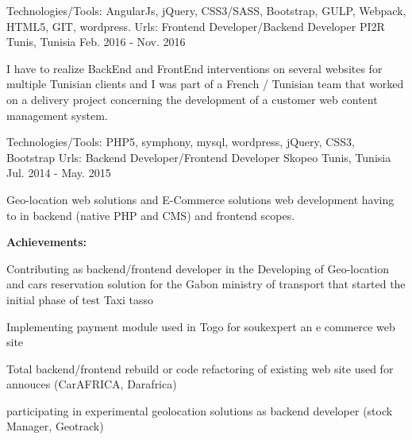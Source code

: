 \begin{cventries}
{\begin{cvitems}
      \end{cvitems}
    }
    {\textcolor{awesome}{Technologies/Tools: } {\color{graytext}}  {AngularJs, jQuery, CSS3/SASS, Bootstrap, GULP, Webpack, HTML5, GIT, wordpress.}}
    {Urls:} 
    { \href{http://anahita.mu/}{ \break
    }}
  \techentries
    {Frontend Developer/Backend Developer}
    {PI2R}
    {Tunis, Tunisia}
    {Feb. 2016 - Nov. 2016}
    {
      \begin{cvitems}
        \item {I have to realize BackEnd and FrontEnd interventions on several websites for multiple Tunisian clients and I was part of a French / Tunisian team that worked on a delivery project concerning the development of a customer web content management system. }
      \end{cvitems}
    }
    {\textcolor{awesome}{Technologies/Tools: } {\color{graytext}}  {PHP5, symphony, mysql, wordpress, jQuery, CSS3, Bootstrap}}
    {Urls:} 
    {
    \href{http://www.milddream.com/fr/ }{} \break
    \href{http://www.ozeol.com/fr/}{} \break
    } 
  \techentries
    {Backend Developer/Frontend Developer}
    {Skopeo}
    {Tunis, Tunisia}
    {Jul. 2014 - May. 2015}
    {
      \begin{cvitems}
        \item {Geo-location web solutions and E-Commerce solutions web development having to in backend (native PHP and CMS) and frontend scopes.}
      \end{cvitems}
\vspace{10pt}\textbf{ Achievements:}
      \begin{cvitems}
	{\vspace{14pt}}
        \item {Contributing as backend/frontend developer in the Developing of Geo-location and cars reservation solution for the Gabon ministry of transport that started the initial phase of test Taxi tasso}
        \item {Implementing payment module used in Togo for soukexpert an e commerce web site  }
        \item {Total backend/frontend rebuild or code refactoring of existing web site used for annouces (CarAFRICA, Darafrica)   }
        \item {participating in experimental geolocation solutions as backend developer (stock Manager, Geotrack)   }

\end{cvitems}}
\end{cventries}
